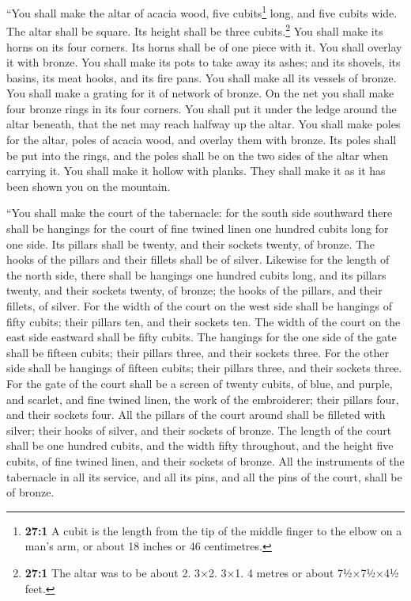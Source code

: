  ``You shall make the altar of acacia wood, five
cubits\footnote{\textbf{27:1} A cubit is the length from the tip of the
  middle finger to the elbow on a man's arm, or about 18 inches or 46
  centimetres.} long, and five cubits wide. The altar shall be square.
Its height shall be three cubits.\footnote{\textbf{27:1} The altar was
  to be about 2. 3×2. 3×1. 4 metres or about 7½×7½×4½ feet.}
 You shall make its horns on its four corners. Its horns
shall be of one piece with it. You shall overlay it with bronze.
 You shall make its pots to take away its ashes; and its
shovels, its basins, its meat hooks, and its fire pans. You shall make
all its vessels of bronze.  You shall make a grating for
it of network of bronze. On the net you shall make four bronze rings in
its four corners.  You shall put it under the ledge around
the altar beneath, that the net may reach halfway up the altar.
 You shall make poles for the altar, poles of acacia wood,
and overlay them with bronze.  Its poles shall be put into
the rings, and the poles shall be on the two sides of the altar when
carrying it.  You shall make it hollow with planks. They
shall make it as it has been shown you on the mountain.

 ``You shall make the court of the tabernacle: for the
south side southward there shall be hangings for the court of fine
twined linen one hundred cubits long for one side.  Its
pillars shall be twenty, and their sockets twenty, of bronze. The hooks
of the pillars and their fillets shall be of silver. 
Likewise for the length of the north side, there shall be hangings one
hundred cubits long, and its pillars twenty, and their sockets twenty,
of bronze; the hooks of the pillars, and their fillets, of silver.
 For the width of the court on the west side shall be
hangings of fifty cubits; their pillars ten, and their sockets ten.
 The width of the court on the east side eastward shall
be fifty cubits.  The hangings for the one side of the
gate shall be fifteen cubits; their pillars three, and their sockets
three.  For the other side shall be hangings of fifteen
cubits; their pillars three, and their sockets three. 
For the gate of the court shall be a screen of twenty cubits, of blue,
and purple, and scarlet, and fine twined linen, the work of the
embroiderer; their pillars four, and their sockets four. 
All the pillars of the court around shall be filleted with silver; their
hooks of silver, and their sockets of bronze.  The length
of the court shall be one hundred cubits, and the width fifty
throughout, and the height five cubits, of fine twined linen, and their
sockets of bronze.  All the instruments of the tabernacle
in all its service, and all its pins, and all the pins of the court,
shall be of bronze.

